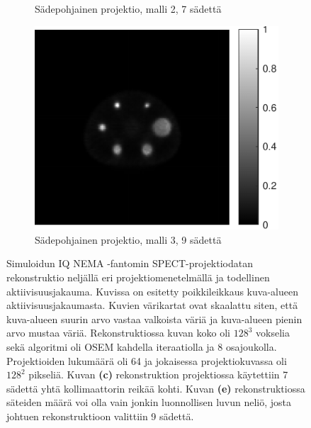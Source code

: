 \begin{figure}[H]
\begin{subfigure}[b]{.25\textwidth}
        \caption{Sädepohjainen projektio, malli 2, 7 sädettä}
    \end{subfigure}%
    \hspace{.075\textwidth}%
    \begin{subfigure}[b]{.25\textwidth}
        \includegraphics[width=\linewidth]{kuvat/nema_rekonstruktio_proj1_malli3_nRay9.pdf}
        \caption{Sädepohjainen projektio, malli 3, 9 sädettä}
    \end{subfigure}
    \caption{Simuloidun IQ NEMA -fantomin SPECT-projektiodatan rekonstruktio neljällä eri projektiomenetelmällä ja todellinen aktiivisuusjakauma. Kuvissa on esitetty poikkileikkaus kuva-alueen aktiivisuusjakaumasta. Kuvien värikartat ovat skaalattu siten, että kuva-alueen suurin arvo vastaa valkoista väriä ja kuva-alueen pienin arvo mustaa väriä. Rekonstruktiossa kuvan koko oli $128^3$ vokselia sekä algoritmi oli OSEM kahdella iteraatiolla ja 8 osajoukolla. Projektioiden lukumäärä oli 64 ja jokaisessa projektiokuvassa oli $128^2$ pikseliä. Kuvan \textbf{(c)} rekonstruktion projektiossa käytettiin 7 sädettä yhtä kollimaattorin reikää kohti. Kuvan \textbf{(e)} rekonstruktiossa säteiden määrä voi olla vain jonkin luonnollisen luvun neliö, josta johtuen rekonstruktioon valittiin 9 sädettä.}
    \label{fig:nema-rekonstruktiot}
\end{figure}

